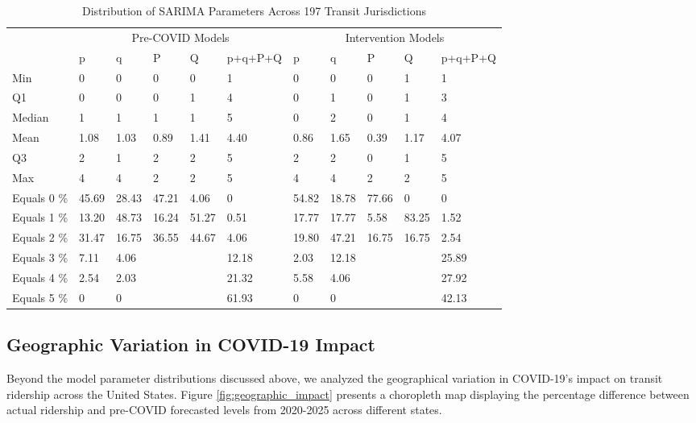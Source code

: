 \documentclass[11pt]{article}
\begin{document}
\begin{table}[!ht]

\caption{Distribution of SARIMA Parameters Across 197 Transit Jurisdictions}
\label{t:jur_fits}
\centering
\begin{tabular}[t]{lllllllllll}
\toprule
\multicolumn{1}{c}{ } & \multicolumn{5}{c}{Pre-COVID Models} & \multicolumn{5}{c}{Intervention Models} \\
\cmidrule(l{3pt}r{3pt}){2-6} \cmidrule(l{3pt}r{3pt}){7-11}
  & p & q & P & Q & p+q+P+Q & p & q & P & Q & p+q+P+Q\\
\midrule
Min & 0 & 0 & 0 & 0 & 1 & 0 & 0 & 0 & 1 & 1\\
Q1 & 0 & 0 & 0 & 1 & 4 & 0 & 1 & 0 & 1 & 3\\
Median & 1 & 1 & 1 & 1 & 5 & 0 & 2 & 0 & 1 & 4\\
Mean & 1.08 & 1.03 & 0.89 & 1.41 & 4.40 & 0.86 & 1.65 & 0.39 & 1.17 & 4.07\\
Q3 & 2 & 1 & 2 & 2 & 5 & 2 & 2 & 0 & 1 & 5\\
\addlinespace
Max & 4 & 4 & 2 & 2 & 5 & 4 & 4 & 2 & 2 & 5\\
\midrule
Equals 0 \% & 45.69 & 28.43 & 47.21 & 4.06 & 0 & 54.82 & 18.78 & 77.66 & 0 & 0\\
Equals 1 \% & 13.20 & 48.73 & 16.24 & 51.27 & 0.51 & 17.77 & 17.77 & 5.58 & 83.25 & 1.52\\
Equals 2 \% & 31.47 & 16.75 & 36.55 & 44.67 & 4.06 & 19.80 & 47.21 & 16.75 & 16.75 & 2.54\\
Equals 3 \% & 7.11 & 4.06 &  &  & 12.18 & 2.03 & 12.18 &  &  & 25.89\\
\addlinespace
Equals 4 \% & 2.54 & 2.03 &  &  & 21.32 & 5.58 & 4.06 &  &  & 27.92\\
Equals 5 \% & 0 & 0 &  &  & 61.93 & 0 & 0 &  &  & 42.13\\
\bottomrule
\end{tabular}
\end{table}

\subsection{Geographic Variation in COVID-19 Impact}

Beyond the model parameter distributions discussed above, we analyzed the geographical variation in COVID-19's impact on transit ridership across the United States. Figure \ref{fig:geographic_impact} presents a choropleth map displaying the percentage difference between actual ridership and pre-COVID forecasted levels from 2020-2025 across different states.
\end{document}
